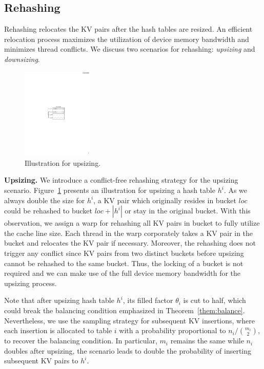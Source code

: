 \subsection{Rehashing}\label{sec:dyn:rehash}
Rehashing relocates the KV pairs after the hash tables are resized. An efficient relocation process maximizes the utilization of device memory bandwidth and minimizes thread conflicts. 
We discuss two scenarios for rehashing: \emph{upsizing} and \emph{downsizing}.

\begin{figure}[t]
	\centering
	\includegraphics[width=0.3\textwidth]{fig/Upsize.pdf}
	\caption{Illustration for upsizing.}
	\label{fig:upsize}
\end{figure}
\vspace{1mm}\noindent\textbf{Upsizing.} 
We introduce a conflict-free rehashing strategy for the upsizing scenario. 
Figure~\ref{fig:upsize} presents an illustration for upsizing a hash table $h^i$. 
As we always double the size for $h^i$, 
a KV pair which originally resides in bucket $loc$ could be rehashed to bucket $loc+|h^i|$ or stay in the original bucket. 
With this observation, we assign a warp for rehashing all KV pairs in bucket to fully utilize the cache line size. 
Each thread in the warp corporately takes a KV pair in the bucket and relocates the KV pair if necessary.
Moreover, the rehashing does not trigger any conflict since KV pairs from two distinct buckets before upsizing cannot be rehashed to the same bucket.  
Thus, the locking of a bucket is not required and we can make use of the full device memory bandwidth for the upsizing process.  

Note that after upsizing hash table $h^i$, its filled factor $\theta_i$ is cut to half, which could break the balancing condition emphasized in Theorem~\ref{them:balance}. Nevertheless, we use the sampling strategy for subsequent KV insertions, where each insertion is allocated to table $i$ with a probability proportional to $n_i/\binom{m_i}{2}$, to recover the balancing condition. In particular, $m_i$ remains the same while $n_i$ doubles after upsizing, the scenario leads to double the probability of inserting subsequent KV pairs to $h^i$. 


